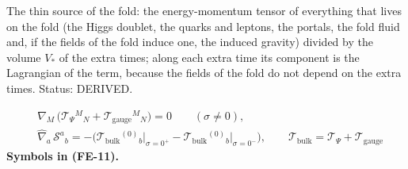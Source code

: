 \documentclass[
  10pt,
]{article}
\begin{document}
The thin source of the fold: the energy-momentum tensor of everything
that lives on the fold (the Higgs doublet, the quarks and leptons, the
portals, the fold fluid and, if the fields of the fold induce one, the
induced gravity) divided by the volume \(V_*\) of the extra times; along
each extra time its component is the Lagrangian of the term, because the
fields of the fold do not depend on the extra times. Status: DERIVED.

\[
\begin{aligned}
&\nabla_M\,\big(\mathcal{T}_\Psi{}^M{}_N + \mathcal{T}_{\mathrm{gauge}}{}^M{}_N\big) = 0\qquad (\sigma \ne 0),\\
&\hat\nabla_a\,\mathcal{S}^a{}_b = -\Big(\mathcal{T}_{\mathrm{bulk}}{}^{(0)}{}_b\big\vert_{\sigma=0^+}
 - \mathcal{T}_{\mathrm{bulk}}{}^{(0)}{}_b\big\vert_{\sigma=0^-}\Big),\qquad
 \mathcal{T}_{\mathrm{bulk}} = \mathcal{T}_\Psi + \mathcal{T}_{\mathrm{gauge}}
\end{aligned} \tag{FE-11}
\] \textbf{Symbols in (FE-11).}
\end{document}

